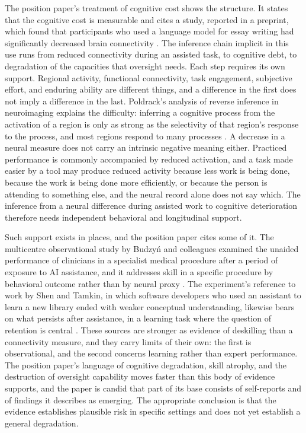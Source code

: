 \documentclass[11pt]{article}
\begin{document}
The position paper's treatment of cognitive cost shows the structure. It states that the cognitive cost is measurable and cites a study, reported in a preprint, which found that participants who used a language model for essay writing had significantly decreased brain connectivity \cite{mitchell,kosmyna}. The inference chain implicit in this use runs from reduced connectivity during an assisted task, to cognitive debt, to degradation of the capacities that oversight needs. Each step requires its own support. Regional activity, functional connectivity, task engagement, subjective effort, and enduring ability are different things, and a difference in the first does not imply a difference in the last. Poldrack's analysis of reverse inference in neuroimaging explains the difficulty: inferring a cognitive process from the activation of a region is only as strong as the selectivity of that region's response to the process, and most regions respond to many processes \cite{poldrack}. A decrease in a neural measure does not carry an intrinsic negative meaning either. Practiced performance is commonly accompanied by reduced activation, and a task made easier by a tool may produce reduced activity because less work is being done, because the work is being done more efficiently, or because the person is attending to something else, and the neural record alone does not say which. The inference from a neural difference during assisted work to cognitive deterioration therefore needs independent behavioral and longitudinal support.

Such support exists in places, and the position paper cites some of it. The multicentre observational study by Budzyń and colleagues examined the unaided performance of clinicians in a specialist medical procedure after a period of exposure to AI assistance, and it addresses skill in a specific procedure by behavioral outcome rather than by neural proxy \cite{budzyn}. The experiment's reference to work by Shen and Tamkin, in which software developers who used an assistant to learn a new library ended with weaker conceptual understanding, likewise bears on what persists after assistance, in a learning task where the question of retention is central \cite{herdagdelen}. These sources are stronger as evidence of deskilling than a connectivity measure, and they carry limits of their own: the first is observational, and the second concerns learning rather than expert performance. The position paper's language of cognitive degradation, skill atrophy, and the destruction of oversight capability moves faster than this body of evidence supports, and the paper is candid that part of its base consists of self-reports and of findings it describes as emerging. The appropriate conclusion is that the evidence establishes plausible risk in specific settings and does not yet establish a general degradation.
\end{document}
